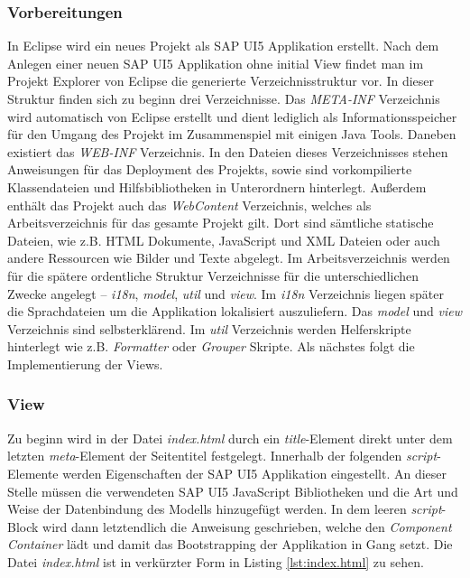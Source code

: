 \subsubsection{Vorbereitungen}
In Eclipse wird ein neues Projekt als SAP UI5 Applikation erstellt. Nach dem Anlegen einer neuen SAP UI5 Applikation ohne initial View findet man im Projekt Explorer von Eclipse die generierte Verzeichnisstruktur vor. In dieser Struktur finden sich zu beginn drei Verzeichnisse. Das \textit{META-INF} Verzeichnis wird automatisch von Eclipse erstellt und dient lediglich als Informationsspeicher für den Umgang des Projekt im Zusammenspiel mit einigen Java Tools. Daneben existiert das \textit{WEB-INF} Verzeichnis. In den Dateien dieses Verzeichnisses stehen Anweisungen für das Deployment des Projekts, sowie sind vorkompilierte Klassendateien und Hilfsbibliotheken in Unterordnern hinterlegt. Außerdem enthält das Projekt auch das \textit{WebContent} Verzeichnis, welches als Arbeitsverzeichnis für das gesamte Projekt gilt. Dort sind sämtliche statische Dateien, wie z.B. HTML Dokumente, JavaScript und XML Dateien oder auch andere Ressourcen wie Bilder und Texte abgelegt. Im Arbeitsverzeichnis werden für die spätere ordentliche Struktur Verzeichnisse für die unterschiedlichen Zwecke angelegt -- \textit{i18n}, \textit{model}, \textit{util} und \textit{view}. Im \textit{i18n} Verzeichnis liegen später die Sprachdateien um die Applikation lokalisiert auszuliefern. Das \textit{model} und \textit{view} Verzeichnis sind selbsterklärend. Im \textit{util} Verzeichnis werden Helferskripte hinterlegt wie z.B. \textit{Formatter} oder \textit{Grouper} Skripte. Als nächstes folgt die Implementierung der Views.

\subsubsection{View}
Zu beginn wird in der Datei \textit{index.html} durch ein \textit{title}-Element direkt unter dem letzten \textit{meta}-Element der Seitentitel festgelegt. Innerhalb der folgenden \textit{script}-Elemente werden Eigenschaften der SAP UI5 Applikation eingestellt. An dieser Stelle müssen die verwendeten SAP UI5 JavaScript Bibliotheken und die Art und Weise der Datenbindung des Modells hinzugefügt werden. In dem leeren \textit{script}-Block wird dann letztendlich die Anweisung geschrieben, welche den \textit{Component Container} lädt und damit das Bootstrapping der Applikation in Gang setzt. Die Datei \textit{index.html} ist in verkürzter Form in Listing \ref{lst:index.html} zu sehen.

